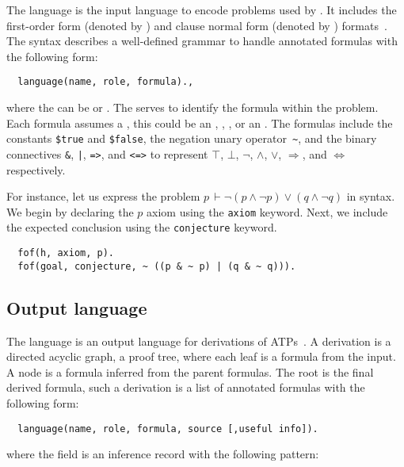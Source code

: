 \documentclass[../main.tex]{subfiles}
\begin{document}
The \TPTP language is the input language to encode problems used by \Metis.
It includes the first-order form (denoted by ) and clause normal form (denoted by ) formats~\cite{sutcliffe2009}.
The \TPTP syntax describes a well-defined grammar to handle annotated
formulas with the following form:
\begin{verbatim}
  language(name, role, formula).,
\end{verbatim}
where the  can be  or . The
 serves to identify the formula within the problem. Each
formula assumes a , this could be an ,
, ,  or an
.  The formulas include the constants
\verb!$true! and \verb!$false!, the negation unary operator~\verb!~!,
and the binary connectives \verb!&!, \verb!|!, \verb!=>!, and
\verb!<=>! to represent $⊤$, $⊥$, $¬$, $∧$, $∨$, $⇒$, and $⇔$
respectively.

\begin{myexamplenum}
  For instance, let us express the problem
  $p\, ⊢ ¬ (p ∧ ¬ p) ∨ (q ∧ ¬ q)$ in \TPTP syntax. We begin by
  declaring the $p$ axiom using the \verb!axiom!  keyword. Next, we
  include the expected conclusion using the \verb!conjecture! keyword.
\begin{verbatim}
  fof(h, axiom, p).
  fof(goal, conjecture, ~ ((p & ~ p) | (q & ~ q))).
\end{verbatim}
\end{myexamplenum}


\subsection{Output language}
\label{ssec:output-language}

The \TSTP language is an output language for derivations of
ATPs~\cite{Sutcliffe-Schulz-Claessen-VanGelder-2006}.
A \TSTP derivation is a directed acyclic graph, a proof tree,
where each leaf is a formula from the \TPTP input. A node is a formula
inferred from the parent formulas. The root is the final derived formula,
such a derivation is a list of annotated formulas with the following form:

\begin{verbatim}
  language(name, role, formula, source [,useful info]).
\end{verbatim}

where the  field is an inference record with the following
pattern:
\end{document}
